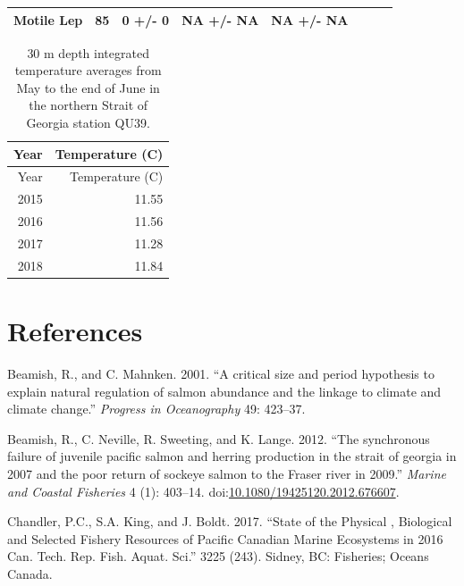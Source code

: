 \documentclass[fleqn,10pt]{wlpeerj} %
\begin{document}
\begin{longtable}[]{@{}llllrlll@{}}
\begin{minipage}[t]{0.11\columnwidth}
Motile Lep\strut
\end{minipage} & \begin{minipage}[t]{0.04\columnwidth}\raggedleft\strut
85\strut
\end{minipage} & \begin{minipage}[t]{0.14\columnwidth}\raggedright\strut
0 +/- 0\strut
\end{minipage} & \begin{minipage}[t]{0.14\columnwidth}\raggedright\strut
NA +/- NA\strut
\end{minipage} & \begin{minipage}[t]{0.14\columnwidth}\raggedright\strut
NA +/- NA\strut
\end{minipage}\tabularnewline
\bottomrule
\end{longtable}

\begin{longtable}[]{@{}rr@{}}
\caption{\label{tab:sst-table} 30 m depth integrated temperature averages
from May to the end of June in the northern Strait of Georgia station
QU39.}\tabularnewline
\toprule
Year & Temperature (C)\tabularnewline
\midrule
\endfirsthead
\toprule
Year & Temperature (C)\tabularnewline
\midrule
\endhead
2015 & 11.55\tabularnewline
2016 & 11.56\tabularnewline
2017 & 11.28\tabularnewline
2018 & 11.84\tabularnewline
\bottomrule
\end{longtable}

\section*{References}\label{references}

\hypertarget{refs}{}
\hypertarget{ref-Beamish2001}{}
Beamish, R., and C. Mahnken. 2001. ``A critical size and period
hypothesis to explain natural regulation of salmon abundance and the
linkage to climate and climate change.'' \emph{Progress in Oceanography}
49: 423--37.

\hypertarget{ref-Beamish2012}{}
Beamish, R., C. Neville, R. Sweeting, and K. Lange. 2012. ``The
synchronous failure of juvenile pacific salmon and herring production in
the strait of georgia in 2007 and the poor return of sockeye salmon to
the Fraser river in 2009.'' \emph{Marine and Coastal Fisheries} 4 (1):
403--14.
doi:\href{https://doi.org/10.1080/19425120.2012.676607}{10.1080/19425120.2012.676607}.

\hypertarget{ref-Chandler2017}{}
Chandler, P.C., S.A. King, and J. Boldt. 2017. ``State of the Physical ,
Biological and Selected Fishery Resources of Pacific Canadian Marine
Ecosystems in 2016 Can. Tech. Rep. Fish. Aquat. Sci.'' 3225 (243).
Sidney, BC: Fisheries; Oceans Canada.
\end{document}
